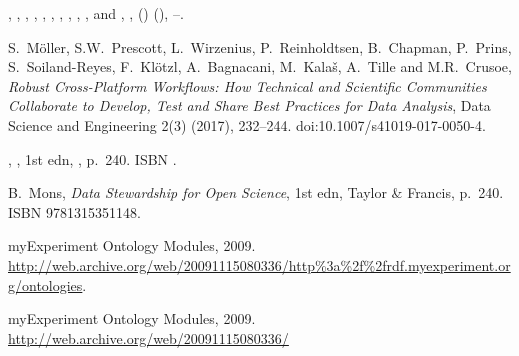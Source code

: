 \documentclass[ds,v1.1.2,openaccess]{iosart2x}%
\begin{document}
\begin{thebibliography}{}
%
\begin{barticle}
,
,
,
,
,
,
,
,
,
,
 and
,
,
()
(),
--.
\end{barticle}
%
\OrigBibText
S.~M\"{o}ller,
S.W.~Prescott,
L.~Wirzenius,
P.~Reinholdtsen,
B.~Chapman,
P.~Prins,
S.~Soiland-Reyes,
F.~Kl\"{o}tzl,
A.~Bagnacani,
M.~Kala\v{s},
A.~Tille and
M.R.~Crusoe,
\textit{Robust Cross-Platform Workflows: How Technical and Scientific
Communities Collaborate to Develop, Test and Share Best Practices for Data
Analysis},
Data Science and Engineering
2(3)
(2017),
232--244.
doi:10.1007/s41019-017-0050-4.
\endOrigBibText
{}
\endbibitem

%
\begin{bbook}
,
,
1st edn,
,
p.~240.
ISBN .
\end{bbook}
%
\OrigBibText
B.~Mons,
\textit{Data Stewardship for Open Science},
1st edn,
Taylor \& Francis,
p.~240.
ISBN 9781315351148.
\endOrigBibText
{}
\endbibitem

%
\begin{botherref}
{{myExperiment Ontology Modules}},
2009.
\url{http://web.archive.org/web/20091115080336/http\%3a\%2f\%2frdf.myexperiment.org/ontologies}.
\end{botherref}
%
\OrigBibText
{myExperiment} Ontology Modules,
2009.
\url{http://web.archive.org/web/20091115080336/}
\endOrigBibText
{}
\endbibitem


\end{thebibliography}
\end{document}
